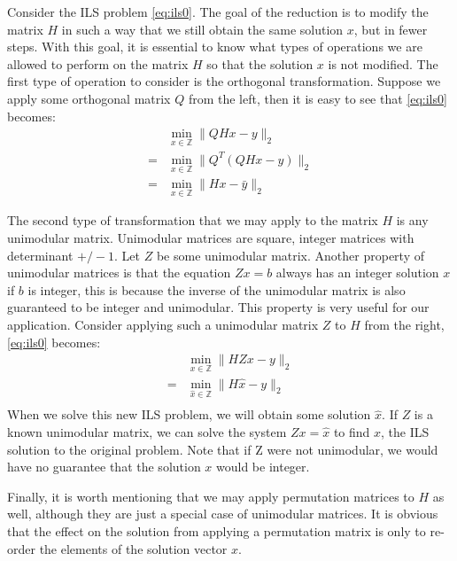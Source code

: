 \documentclass[12pt,Bold,letterpaper]{mcgilletdclass}
\begin{document}
Consider the ILS problem \eqref{eq:ils0}. The goal of the reduction is to modify the matrix $H$ in such a way that we still obtain the same solution $x$, but in fewer steps. With this goal, it is essential to know what types of operations we are allowed to perform on the matrix $H$ so that the solution $x$ is not modified. The first type of operation to consider is the orthogonal transformation. Suppose we apply some orthogonal matrix $Q$ from the left, then it is easy to see that \eqref{eq:ils0} becomes: 
\begin{align}
&\min_{x\in {\mathbb{Z} }}  \| QHx - y \|_2\\
=&\min_{x\in {\mathbb{Z} }}  \| Q^T(QHx - y) \|_2\\
=&\min_{x\in {\mathbb{Z} }}  \| Hx - \bar{y} \|_2
\end{align}

The second type of transformation that we may apply to the matrix $H$ is any unimodular matrix. Unimodular matrices are square, integer matrices with determinant $+/-1$. Let $Z$ be some unimodular matrix. Another property of unimodular matrices is that the equation $Zx=b$ always has an integer solution $x$ if $b$ is integer, this is because the inverse of the unimodular matrix is also guaranteed to be integer and unimodular. This property is very useful for our application. Consider applying such a unimodular matrix $Z$ to $H$ from the right, \eqref{eq:ils0} becomes: 
\begin{align}
&\min_{x\in {\mathbb{Z} }}  \| HZx - y \|_2\\
=&\min_{\hat{x}\in {\mathbb{Z} }}  \| H\hat{x} - y \|_2\\
\end{align}
When we solve this new ILS problem, we will obtain some solution $\hat{x}$. If $Z$ is a known unimodular matrix, we can solve the system $Zx = \hat{x}$ to find $x$, the ILS solution to the original problem. Note that if Z were not unimodular, we would have no guarantee that the solution $x$ would be integer.

Finally, it is worth mentioning that we may apply permutation matrices to $H$ as well, although they are just a special case of unimodular matrices. It is obvious that the effect on the solution from applying a permutation matrix is only to re-order the elements of the solution vector $x$.
\end{document}
